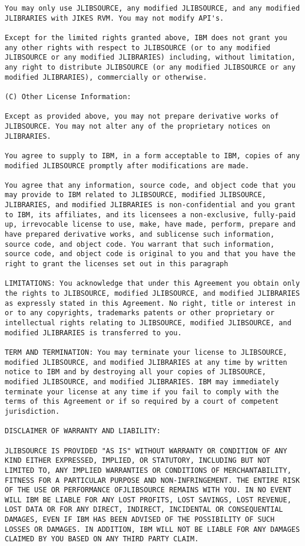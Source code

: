 \begin{verbatim}
You may only use JLIBSOURCE, any modified JLIBSOURCE, and any modified
JLIBRARIES with JIKES RVM. You may not modify API's.

Except for the limited rights granted above, IBM does not grant you
any other rights with respect to JLIBSOURCE (or to any modified
JLIBSOURCE or any modified JLIBRARIES) including, without limitation,
any right to distribute JLIBSOURCE (or any modified JLIBSOURCE or any
modified JLIBRARIES), commercially or otherwise.

(C) Other License Information: 

Except as provided above, you may not prepare derivative works of
JLIBSOURCE. You may not alter any of the proprietary notices on
JLIBRARIES.

You agree to supply to IBM, in a form acceptable to IBM, copies of any
modified JLIBSOURCE promptly after modifications are made.

You agree that any information, source code, and object code that you
may provide to IBM related to JLIBSOURCE, modified JLIBSOURCE,
JLIBRARIES, and modified JLIBRARIES is non-confidential and you grant
to IBM, its affiliates, and its licensees a non-exclusive, fully-paid
up, irrevocable license to use, make, have made, perform, prepare and
have prepared derivative works, and sublicense such information,
source code, and object code. You warrant that such information,
source code, and object code is original to you and that you have the
right to grant the licenses set out in this paragraph

LIMITATIONS: You acknowledge that under this Agreement you obtain only
the rights to JLIBSOURCE, modified JLIBSOURCE, and modified JLIBRARIES
as expressly stated in this Agreement. No right, title or interest in
or to any copyrights, trademarks patents or other proprietary or
intellectual rights relating to JLIBSOURCE, modified JLIBSOURCE, and
modified JLIBRARIES is transferred to you.

TERM AND TERMINATION: You may terminate your license to JLIBSOURCE,
modified JLIBSOURCE, and modified JLIBRARIES at any time by written
notice to IBM and by destroying all your copies of JLIBSOURCE,
modified JLIBSOURCE, and modified JLIBRARIES. IBM may immediately
terminate your license at any time if you fail to comply with the
terms of this Agreement or if so required by a court of competent
jurisdiction.

DISCLAIMER OF WARRANTY AND LIABILITY: 

JLIBSOURCE IS PROVIDED "AS IS" WITHOUT WARRANTY OR CONDITION OF ANY
KIND EITHER EXPRESSED, IMPLIED, OR STATUTORY, INCLUDING BUT NOT
LIMITED TO, ANY IMPLIED WARRANTIES OR CONDITIONS OF MERCHANTABILITY,
FITNESS FOR A PARTICULAR PURPOSE AND NON-INFRINGEMENT. THE ENTIRE RISK
OF THE USE OR PERFORMANCE OFJLIBSOURCE REMAINS WITH YOU. IN NO EVENT
WILL IBM BE LIABLE FOR ANY LOST PROFITS, LOST SAVINGS, LOST REVENUE,
LOST DATA OR FOR ANY DIRECT, INDIRECT, INCIDENTAL OR CONSEQUENTIAL
DAMAGES, EVEN IF IBM HAS BEEN ADVISED OF THE POSSIBILITY OF SUCH
LOSSES OR DAMAGES. IN ADDITION, IBM WILL NOT BE LIABLE FOR ANY DAMAGES
CLAIMED BY YOU BASED ON ANY THIRD PARTY CLAIM.


\end{verbatim}
